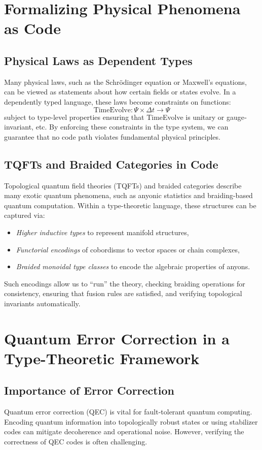 \documentclass[12pt]{article}
\begin{document}
\section{Formalizing Physical Phenomena as Code}
\label{sec:formalizing_physics_code}

\subsection{Physical Laws as Dependent Types}
Many physical laws, such as the Schrödinger equation or Maxwell’s equations, can be viewed as statements about how certain fields or states evolve. In a dependently typed language, these laws become constraints on functions:
\[
\text{TimeEvolve} : \Psi \times \Delta t \to \Psi
\]
subject to type-level properties ensuring that TimeEvolve is unitary or gauge‐invariant, etc. By enforcing these constraints in the type system, we can guarantee that no code path violates fundamental physical principles.

\subsection{TQFTs and Braided Categories in Code}
Topological quantum field theories (TQFTs) and braided categories describe many exotic quantum phenomena, such as anyonic statistics and braiding-based quantum computation. Within a type-theoretic language, these structures can be captured via:
\begin{itemize}[label=$\bullet$]
    \item \emph{Higher inductive types} to represent manifold structures,
    \item \emph{Functorial encodings} of cobordisms to vector spaces or chain complexes,
    \item \emph{Braided monoidal type classes} to encode the algebraic properties of anyons.
\end{itemize}
Such encodings allow us to “run” the theory, checking braiding operations for consistency, ensuring that fusion rules are satisfied, and verifying topological invariants automatically.

\section{Quantum Error Correction in a Type-Theoretic Framework}
\label{sec:qec_code}

\subsection{Importance of Error Correction}
Quantum error correction (QEC) is vital for fault-tolerant quantum computing. Encoding quantum information into topologically robust states or using stabilizer codes can mitigate decoherence and operational noise. However, verifying the correctness of QEC codes is often challenging.
\end{document}
